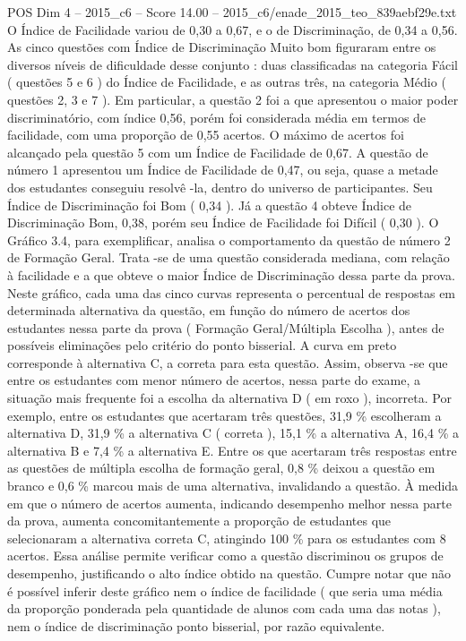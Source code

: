 \begin{textsample}{POS Dim 4 – 2015\_c6 – Score 14.00 – 2015\_c6/enade\_2015\_teo\_839aebf29e.txt}
O Índice de Facilidade variou de 0,30 a 0,67, e o de Discriminação, de 0,34 a 0,56.
As cinco questões com Índice de Discriminação Muito bom figuraram entre os diversos níveis de dificuldade desse conjunto : duas classificadas na categoria Fácil ( questões 5 e 6 ) do Índice de Facilidade, e as outras três, na categoria Médio ( questões 2, 3 e 7 ).
Em particular, a questão 2 foi a que apresentou o maior poder discriminatório, com índice 0,56, porém foi considerada média em termos de facilidade, com uma proporção de 0,55 acertos.
O máximo de acertos foi alcançado pela questão 5 com um Índice de Facilidade de 0,67.
A questão de número 1 apresentou um Índice de Facilidade de 0,47, ou seja, quase a metade dos estudantes conseguiu resolvê -la, dentro do universo de participantes.
Seu Índice de Discriminação foi Bom ( 0,34 ).
Já a questão 4 obteve Índice de Discriminação Bom, 0,38, porém seu Índice de Facilidade foi Difícil ( 0,30 ).
O Gráfico 3.4, para exemplificar, analisa o comportamento da questão de número 2 de Formação Geral.
Trata -se de uma questão considerada mediana, com relação à facilidade e a que obteve o maior Índice de Discriminação dessa parte da prova.
Neste gráfico, cada uma das cinco curvas representa o percentual de respostas em determinada alternativa da questão, em função do número de acertos dos estudantes nessa parte da prova ( Formação Geral/Múltipla Escolha ), antes de possíveis eliminações pelo critério do ponto bisserial.
A curva em preto corresponde à alternativa C, a correta para esta questão.
Assim, observa -se que entre os estudantes com menor número de acertos, nessa parte do exame, a situação mais frequente foi a escolha da alternativa D ( em roxo ), incorreta.
Por exemplo, entre os estudantes que acertaram três questões, 31,9 \% escolheram a alternativa D, 31,9 \% a alternativa C ( correta ), 15,1 \% a alternativa A, 16,4 \% a alternativa B e 7,4 \% a alternativa E.
Entre os que acertaram três respostas entre as questões de múltipla escolha de formação geral, 0,8 \% deixou a questão em branco e 0,6 \% marcou mais de uma alternativa, invalidando a questão.
À medida em que o número de acertos aumenta, indicando desempenho melhor nessa parte da prova, aumenta concomitantemente a proporção de estudantes que selecionaram a alternativa correta C, atingindo 100 \% para os estudantes com 8 acertos.
Essa análise permite verificar como a questão discriminou os grupos de desempenho, justificando o alto índice obtido na questão.
Cumpre notar que não é possível inferir deste gráfico nem o índice de facilidade ( que seria uma média da proporção ponderada pela quantidade de alunos com cada uma das notas ), nem o índice de discriminação ponto bisserial, por razão equivalente.

\end{textsample}
